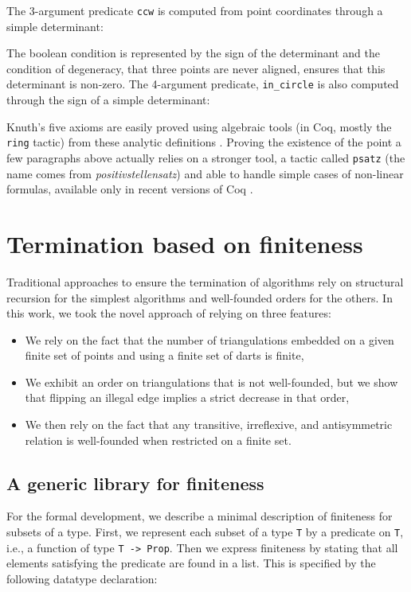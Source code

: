 \documentclass{llncs}
\begin{document}
The 3-argument predicate {\tt ccw} is computed from
point coordinates through a simple determinant:

The boolean condition is represented by the sign of the determinant and the
condition of degeneracy, that three points are never aligned, ensures that
this determinant is non-zero.  The 4-argument predicate, {\tt in\_circle}
is also computed through the sign of a simple determinant:
 
Knuth's five axioms are easily proved using algebraic tools (in Coq,
mostly the {\tt ring} tactic) from these analytic definitions
\cite{knu,pic:ber}.  Proving the existence of the point  a few
paragraphs above actually relies on a stronger tool, a tactic called
{\tt psatz} (the name comes from {\em positivstellensatz})
and able to handle simple cases of non-linear formulas,
available only in recent versions of Coq \cite{bes06}.

\section{Termination based on finiteness}
\label{TF}
Traditional approaches to ensure the termination of algorithms rely on
structural recursion for the simplest algorithms and well-founded orders for
the others.  In this work, we took the novel approach of relying on three
features:
\begin{itemize}
\item We rely on the fact that the number of triangulations embedded on a
  given finite set of points and using a finite set of darts is finite,
\item We exhibit an order on triangulations that is not well-founded,
  but we show that flipping an illegal edge implies a strict decrease
  in that order,
\item We then rely on the fact that any transitive, irreflexive, and
antisymmetric relation  is well-founded when restricted on a finite set.
\end{itemize}

\subsection{A generic library for finiteness}
For the formal development, we describe a minimal description of finiteness for subsets of a type.  First, we represent each subset of a type {\tt T} by a predicate on {\tt T}, i.e., a function of type {\tt T -> Prop}.  Then we express finiteness by stating that all elements satisfying the predicate are found in a list. This is specified by the following datatype declaration:
\end{document}
